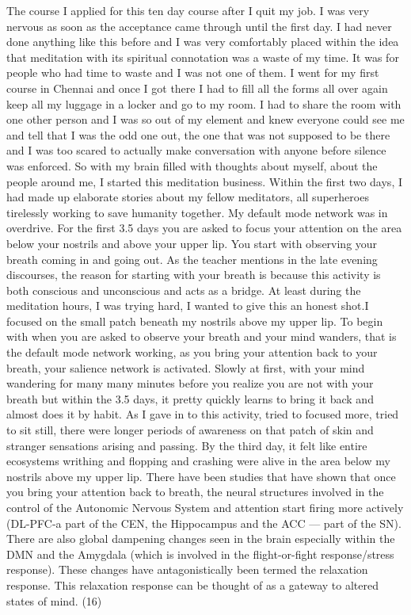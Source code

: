 \documentclass[twocolumn]{article}
\begin{document}
The course
I applied for this ten day course after I quit my job. I was very nervous as soon as the acceptance came through until the first day. I had never done anything like this before and I was very comfortably placed within the idea that meditation with its spiritual connotation was a waste of my time. It was for people who had time to waste and I was not one of them. I went for my first course in Chennai and once I got there I had to fill all the forms all over again keep all my luggage in a locker and go to my room. I had to share the room with one other person and I was so out of my element and knew everyone could see me and tell that I was the odd one out, the one that was not supposed to be there and I was too scared to actually make conversation with anyone before silence was enforced. So with my brain filled with thoughts about myself, about the people around me, I started this meditation business. Within the first two days, I had made up elaborate stories about my fellow meditators, all superheroes tirelessly working to save humanity together. My default mode network was in overdrive.
For the first 3.5 days you are asked to focus your attention on the area below your nostrils and above your upper lip. You start with observing your breath coming in and going out. As the teacher mentions in the late evening discourses, the reason for starting with your breath is because this activity is both conscious and unconscious and acts as a bridge.
At least during the meditation hours, I was trying hard, I wanted to give this an honest shot.I focused on the small patch beneath my nostrils above my upper lip. To begin with when you are asked to observe your breath and your mind wanders, that is the default mode network working, as you bring your attention back to your breath, your salience network is activated. Slowly at first, with your mind wandering for many many minutes before you realize you are not with your breath but within the 3.5 days, it pretty quickly learns to bring it back and almost does it by habit. As I gave in to this activity, tried to focused more, tried to sit still, there were longer periods of awareness on that patch of skin and stranger sensations arising and passing. By the third day, it felt like entire ecosystems writhing and flopping and crashing were alive in the area below my nostrils above my upper lip. There have been studies that have shown that once you bring your attention back to breath, the neural structures involved in the control of the Autonomic Nervous System and attention start firing more actively (DL-PFC-a part of the CEN, the Hippocampus and the ACC — part of the SN). There are also global dampening changes seen in the brain especially within the DMN and the Amygdala (which is involved in the flight-or-fight response/stress response). These changes have antagonistically been termed the relaxation response. This relaxation response can be thought of as a gateway to altered states of mind. (16)
\end{document}
